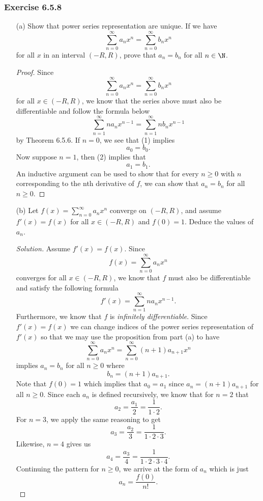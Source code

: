 \subsubsection{Exercise 6.5.8} 
\begin{enumerate}
    \item[(a)] Show that power series representation are unique. If we have 
        \[  \sum_{ n=0 }^{ \infty  } a_n x^n = \sum_{ n=0 }^{ \infty  } b_n x^n \]
        for all \( x  \) in an interval \( (-R ,R ) \), prove that \( a_n = b_n  \) for all \( n \in \N  \).
        \begin{proof}
       Since 
       \[  \sum_{ n=0  }^{ \infty  } a_n x^n = \sum_{ n=0 }^{ \infty  } b_n x^n  \tag{1} \]
       for all \( x \in (-R ,R ) \), we know that the series above must also be differentiable and follow the formula below
       \[  \sum_{ n=1 }^{ \infty  } na_n x^{n-1} = \sum_{ n=1 }^{ \infty  } nb_n x^{n-1} \tag{2} \] by Theorem 6.5.6. If \( n = 0  \), we see that (1) implies 
       \[  a_0 = b_0. \] Now suppose \( n = 1  \), then (2) implies that 
       \[  a_1 = b_1. \] An inductive argument can be used to show that for every \( n \geq 0  \) with \( n  \) corresponding to the nth derivative of \( f  \), we can show that \( a_n = b_n  \) for all \( n \geq 0  \).
        \end{proof}
    \item[(b)] Let \( f(x) = \sum_{ n=0  }^{ \infty  } a_n x^n  \) converge on \( (-R ,R ) \), and assume \( f'(x) = f(x)  \) for all \( x \in (-R ,R ) \) and \( f(0) = 1  \). Deduce the values of \( a_n \).
        \begin{proof}[Solution]
        Assume \( f'(x) = f(x)  \). Since 
        \[  f(x) = \sum_{ n=0  }^{ \infty  } a_n x^n  \] converges for all \( x \in (-R ,R ) \), we know that \( f  \) must also be differentiable and satisfy the following formula 
        \[  f'(x) = \sum_{ n=1  }^{ \infty  } na_n x^{n-1}. \]  Furthermore, we know that \( f  \) is \textit{infinitely differentiable}. Since \( f'(x) = f(x)  \) we can change indices of the power series representation of \( f'(x)  \) so that we may use the proposition from part (a) to have 
        \[  \sum_{ n=0  }^{ \infty  } a_n x^n = \sum_{ n=0 }^{ \infty  } (n+1) a_{n+1} x^n \]
       implies \( a_n = b_n  \) for all \(  n \geq 0  \) where 
       \[  b_n = (n+1)a_{n+1}. \]
       Note that \( f(0) = 1  \) which implies that \( a_0 = a_1  \) since \( a_n = (n +1) a_{n+1} \) for all \( n \geq 0  \). Since each \( a_n  \) is defined recursively, we know that for \( n =2  \) that 
       \[  a_2 = \frac{ a_{1} }{ 2  } = \frac{ 1 }{ 1 \cdot 2 }  . \]
       For \( n = 3  \), we apply the same reasoning to get 
       \[  a_{3} = \frac{ a_{2} }{ 3  } = \frac{ 1 }{ 1 \cdot 2 \cdot 3  }.  \] Likewise, \( n =4  \) gives us 
       \[  a_4 = \frac{ a_{3} }{ 4  } = \frac{ 1 }{  1 \cdot 2 \cdot 3 \cdot 4  }.\] Continuing the pattern for \( n \geq 0  \), we arrive at the form of \( a_n  \) which is just 
       \[  a_n = \frac{ f(0) }{ n! }. \]
        \end{proof}
\end{enumerate}

